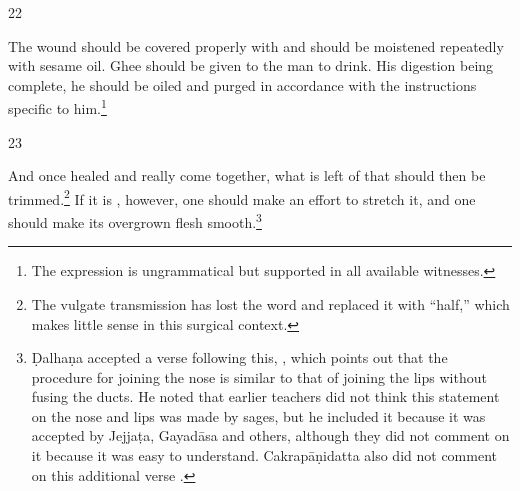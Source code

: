 \begin{translation}
\begin{sloka}
\end{sloka}    
\item[22] 
\begin{sloka}
 The wound should be covered properly with  and should be
moistened repeatedly with sesame oil.  Ghee should be given to the man to drink. 
His digestion being complete, he should be oiled and purged in accordance with
the instructions specific to him.\footnote{The expression 
    is ungrammatical but supported in all available witnesses.}
\end{sloka}
    
\item[23] %
\begin{sloka}
And once healed and really come together, what is left of that  should then be trimmed.\footnote{The vulgate transmission has lost the
    word  and replaced it with  “half,” which makes little
    sense in this surgical  context.} If it is , however, one 
    should
    make an effort to stretch it, and one should make its overgrown flesh
    smooth.\footnote{Ḍalhaṇa  accepted a verse following this, , which
        points out that the procedure for joining the nose is similar to that of joining
        the lips without fusing the ducts. He noted that earlier teachers did not think
        this statement on the nose and lips was made by sages, but he included it because
        it was accepted by Jejjaṭa, Gayadāsa and others, although they did not comment on
        it because it was easy to understand. Cakrapāṇidatta also did not comment on this
        additional verse \citep[133]{acar-1939}.}

\end{sloka}    
    
\end{translation}    
